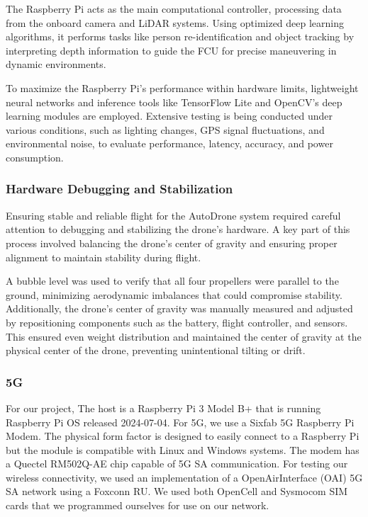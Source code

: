\documentclass[conference]{IEEEtran}
\begin{document}
The Raspberry Pi acts as the main computational controller, processing data from the onboard camera and LiDAR systems. Using optimized deep learning algorithms, it performs tasks like person re-identification and object tracking by interpreting depth information to guide the FCU for precise maneuvering in dynamic environments.

To maximize the Raspberry Pi’s performance within hardware limits, lightweight neural networks and inference tools like TensorFlow Lite and OpenCV's deep learning modules are employed. Extensive testing is being conducted under various conditions, such as lighting changes, GPS signal fluctuations, and environmental noise, to evaluate performance, latency, accuracy, and power consumption.

\subsubsection{Hardware Debugging and Stabilization}
Ensuring stable and reliable flight for the AutoDrone system required careful attention to debugging and stabilizing the drone's hardware. A key part of this process involved balancing the drone's center of gravity and ensuring proper alignment to maintain stability during flight.

A bubble level was used to verify that all four propellers were parallel to the ground, minimizing aerodynamic imbalances that could compromise stability. Additionally, the drone’s center of gravity was manually measured and adjusted by repositioning components such as the battery, flight controller, and sensors. This ensured even weight distribution and maintained the center of gravity at the physical center of the drone, preventing unintentional tilting or drift.


\subsubsection{5G}
 For our project, The host is a Raspberry Pi 3 Model B+ that is running Raspberry Pi OS released 2024-07-04. For 5G, we use a Sixfab 5G Raspberry Pi Modem. The physical form factor is designed to easily connect to a Raspberry Pi but the module is compatible with Linux and Windows systems. The modem has a Quectel RM502Q-AE chip capable of 5G SA communication. For testing our wireless connectivity, we used an implementation of a OpenAirInterface (OAI) 5G SA network using a Foxconn RU. We used both OpenCell and Sysmocom SIM cards that we programmed ourselves for use on our network. 
\end{document}
